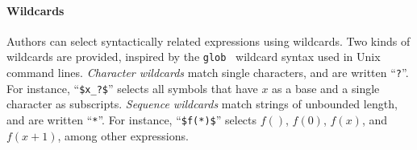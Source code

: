 \paragraph{Wildcards} Authors can select syntactically related expressions using wildcards. Two kinds of wildcards are provided, inspired by the \texttt{glob}~\cite{UnixMan} wildcard syntax used in Unix command lines. \emph{Character wildcards} match single characters, and are written ``\texttt{?}''. For instance, ``\texttt{\$x\_?\$}'' selects all symbols that have $x$ as a base and a single character as subscripts. \emph{Sequence wildcards} match strings of unbounded length, and are written ``\texttt{*}''. For instance, ``\texttt{\$f(*)\$}'' selects $f()$, $f(0)$, $f(x)$, and $f(x + 1)$, among other expressions. 



